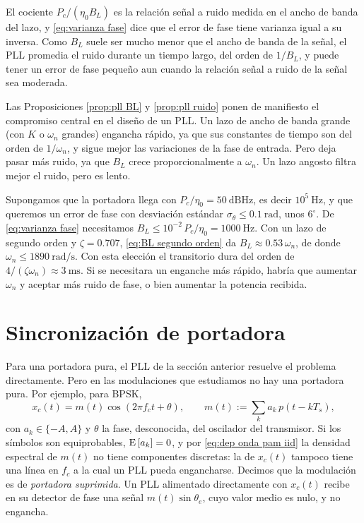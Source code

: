 El cociente $P_c/(\eta_0B_L)$ es la relación señal a ruido medida en el ancho de banda del lazo, y \eqref{eq:varianza fase} dice que el error de fase tiene varianza igual a su inversa. Como $B_L$ suele ser mucho menor que el ancho de banda de la señal, el PLL promedia el ruido durante un tiempo largo, del orden de $1/B_L$, y puede tener un error de fase pequeño aun cuando la relación señal a ruido de la señal sea moderada.

Las Proposiciones \ref{prop:pll BL} y \ref{prop:pll ruido} ponen de manifiesto el compromiso central en el diseño de un PLL. Un lazo de ancho de banda grande (con $K$ o $\omega_n$ grandes) engancha rápido, ya que sus constantes de tiempo son del orden de $1/\omega_n$, y sigue mejor las variaciones de la fase de entrada. Pero deja pasar más ruido, ya que $B_L$ crece proporcionalmente a $\omega_n$. Un lazo angosto filtra mejor el ruido, pero es lento.

\begin{ejemplo}\label{ejemplo:diseno pll}
Supongamos que la portadora llega con $P_c/\eta_0=50\ \unit{\deci\bel\hertz}$, es decir $10^5\ \unit{\hertz}$, y que queremos un error de fase con desviación estándar $\sigma_\theta\leqslant 0.1\ \unit{\radian}$, unos $6^\circ$. De \eqref{eq:varianza fase} necesitamos $B_L\leqslant 10^{-2}\, P_c/\eta_0 = 1000\ \unit{\hertz}$. Con un lazo de segundo orden y $\zeta=0.707$, \eqref{eq:BL segundo orden} da $B_L\approx 0.53\,\omega_n$, de donde $\omega_n\leqslant 1890\ \unit{\radian\per\second}$. Con esta elección el transitorio dura del orden de $4/(\zeta\omega_n)\approx 3\ \unit{\milli\second}$. Si se necesitara un enganche más rápido, habría que aumentar $\omega_n$ y aceptar más ruido de fase, o bien aumentar la potencia recibida.
\end{ejemplo}

\section{Sincronización de portadora}\label{sec:sincronizacion portadora}

Para una portadora pura, el PLL de la sección anterior resuelve el problema directamente. Pero en las modulaciones que estudiamos no hay una portadora pura. Por ejemplo, para BPSK,
\begin{equation*}
    x_c(t) = m(t)\cos(2\pi f_c t+\theta), \qquad m(t) := \sum_k a_k\, p(t-kT_s),
\end{equation*}
con $a_k\in\{-A,A\}$ y $\theta$ la fase, desconocida, del oscilador del transmisor. Si los símbolos son equiprobables, $\mathrm{E}\left[a_k\right]=0$, y por \eqref{eq:dep onda pam iid} la densidad espectral de $m(t)$ no tiene componentes discretas: la de $x_c(t)$ tampoco tiene una línea en $f_c$ a la cual un PLL pueda engancharse. Decimos que la modulación es de \emph{portadora suprimida}. Un PLL alimentado directamente con $x_c(t)$ recibe en su detector de fase una señal $m(t)\sin\theta_e$, cuyo valor medio es nulo, y no engancha.

